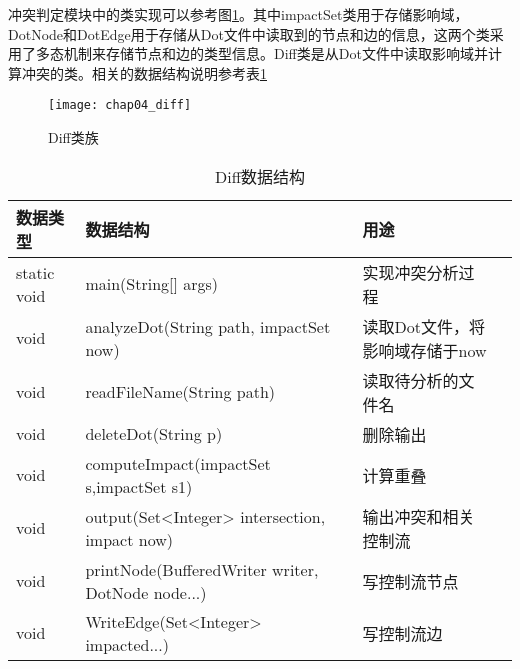 


冲突判定模块中的类实现可以参考图\ref {diff}。其中impactSet类用于存储影响域，DotNode和DotEdge用于存储从Dot文件中读取到的节点和边的信息，这两个类采用了多态机制来存储节点和边的类型信息。Diff类是从Dot文件中读取影响域并计算冲突的类。相关的数据结构说明参考表\ref {diff_data}

\begin{figure}[H]
	\centering
	\texttt{[image: chap04\_diff]}
	\caption {Diff类族}
	\label {diff}	
\end{figure}

\begin{table}[H]
	\caption{Diff数据结构}
	\label{diff_data}
	\centering
	\begin{tabular}{lllc}
		\toprule[1.5pt]
		{\heiti 数据类型} &{\heiti 数据结构} & {\heiti 用途} \\\midrule[1pt]
		static void & main(String[] args) & 实现冲突分析过程\\
		void & analyzeDot(String path, impactSet now) & 读取Dot文件，将影响域存储于now \\
		void & readFileName(String path) & 读取待分析的文件名\\
		void & deleteDot(String p) & 删除输出\\
		void & computeImpact(impactSet s,impactSet s1) & 计算重叠\\
		void & output(Set<Integer> intersection, impact now) & 输出冲突和相关控制流\\
		void & printNode(BufferedWriter writer, DotNode node...) & 写控制流节点\\
		void &  WriteEdge(Set<Integer>  impacted...) & 写控制流边\\
		\bottomrule[1.5pt] 
	\end{tabular}
\end{table}

